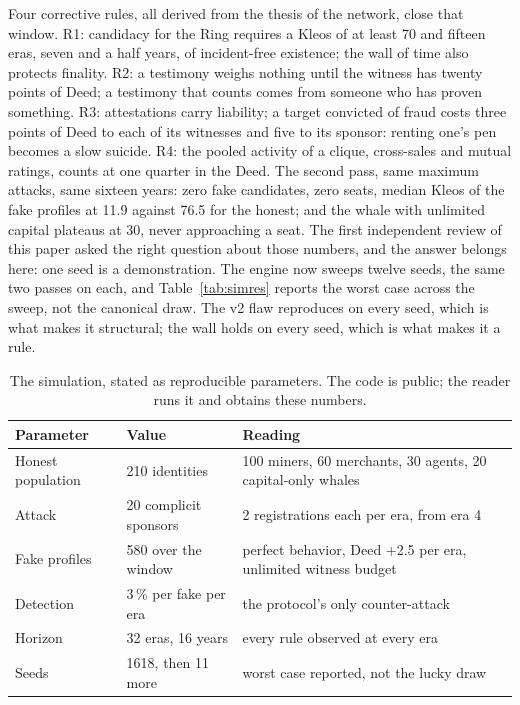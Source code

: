 Four corrective rules, all derived from the thesis of the network, close
that window. R1: candidacy for the Ring requires a Kleos of at least 70
and fifteen eras, seven and a half years, of incident-free existence;
the wall of time also protects finality. R2: a testimony weighs nothing
until the witness has twenty points of Deed; a testimony that counts
comes from someone who has proven something. R3: attestations carry
liability; a target convicted of fraud costs three points of Deed to
each of its witnesses and five to its sponsor: renting one's pen becomes
a slow suicide. R4: the pooled activity of a clique, cross-sales and
mutual ratings, counts at one quarter in the Deed. The second pass, same
maximum attacks, same sixteen years: zero fake candidates,
zero seats, median Kleos of the fake profiles at 11.9 against 76.5 for
the honest; and the whale with unlimited capital plateaus at 30, never
approaching a seat. The first independent review of this paper asked the
right question about those numbers, and the answer belongs here: one
seed is a demonstration. The engine now sweeps twelve seeds, the same
two passes on each, and Table~\ref{tab:simres} reports the worst case
across the sweep, not the canonical draw. The v2 flaw reproduces on
every seed, which is what makes it structural; the wall holds on every
seed, which is what makes it a rule.

\begin{table}[htbp]
\centering
\small
\caption{The simulation, stated as reproducible parameters. The code is
public; the reader runs it and obtains these numbers.}
\label{tab:simparams}
\begin{tabularx}{\textwidth}{@{}L{5.2cm}L{4.2cm}Y@{}}
\toprule
Parameter & Value & Reading \\
\midrule
Honest population & 210 identities & 100 miners, 60 merchants, 30 agents, 20 capital-only whales \\
Attack & 20 complicit sponsors & 2 registrations each per era, from era 4 \\
Fake profiles & 580 over the window & perfect behavior, Deed +2.5 per era, unlimited witness budget \\
Detection & 3\,\% per fake per era & the protocol's only counter-attack \\
Horizon & 32 eras, 16 years & every rule observed at every era \\
Seeds & 1618, then 11 more & worst case reported, not the lucky draw \\
\bottomrule
\end{tabularx}
\end{table}

